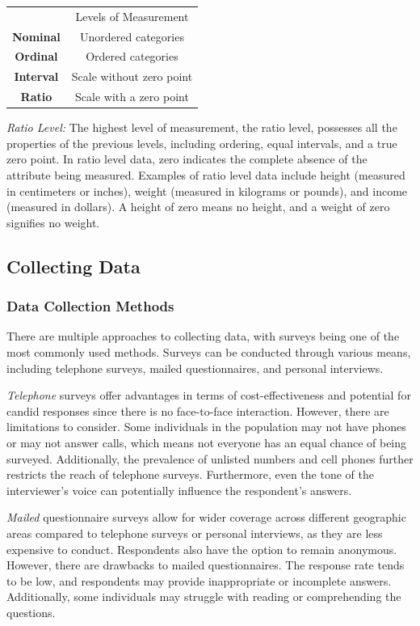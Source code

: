 \documentclass{article}
\begin{document}
\begin{margintable}
\begin{tabular}{cc} 
    & Levels of Measurement \\
    \textbf{Nominal} & Unordered categories \\
    \textbf{Ordinal} & Ordered categories \\
    \textbf{Interval} & Scale without zero point \\
    \textbf{Ratio} & Scale with a zero point
\end{tabular}
\end{margintable}

\emph{Ratio Level:} The highest level of measurement, the ratio level, possesses all the properties of the previous levels, including ordering, equal intervals, and a true zero point. In ratio level data, zero indicates the complete absence of the attribute being measured. Examples of ratio level data include height (measured in centimeters or inches), weight (measured in kilograms or pounds), and income (measured in dollars). A height of zero means no height, and a weight of zero signifies no weight.

\subsection{Collecting Data}

\subsubsection{Data Collection Methods}

There are multiple approaches to collecting data, with surveys being one of the most commonly used methods. Surveys can be conducted through various means, including telephone surveys, mailed questionnaires, and personal interviews.

\emph{Telephone} surveys offer advantages in terms of cost-effectiveness and potential for candid responses since there is no face-to-face interaction. However, there are limitations to consider. Some individuals in the population may not have phones or may not answer calls, which means not everyone has an equal chance of being surveyed. Additionally, the prevalence of unlisted numbers and cell phones further restricts the reach of telephone surveys. Furthermore, even the tone of the interviewer's voice can potentially influence the respondent's answers.

\emph{Mailed} questionnaire surveys allow for wider coverage across different geographic areas compared to telephone surveys or personal interviews, as they are less expensive to conduct. Respondents also have the option to remain anonymous. However, there are drawbacks to mailed questionnaires. The response rate tends to be low, and respondents may provide inappropriate or incomplete answers. Additionally, some individuals may struggle with reading or comprehending the questions.
\end{document}

